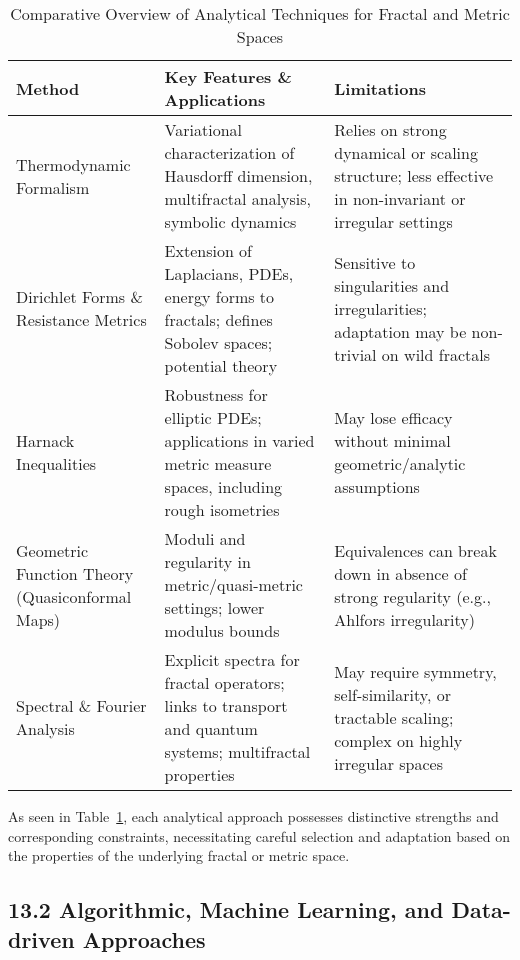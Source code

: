\documentclass[11pt]{article}
\begin{document}
\begin{table}[h]
\centering
\caption{Comparative Overview of Analytical Techniques for Fractal and Metric Spaces}
\label{tab:analytical_methods}
\begin{tabular}{|l|p{5.5cm}|p{4.5cm}|}
\hline
\textbf{Method} & \textbf{Key Features \& Applications} & \textbf{Limitations} \\
\hline
Thermodynamic Formalism & Variational characterization of Hausdorff dimension, multifractal analysis, symbolic dynamics & Relies on strong dynamical or scaling structure; less effective in non-invariant or irregular settings \\
\hline
Dirichlet Forms \& Resistance Metrics & Extension of Laplacians, PDEs, energy forms to fractals; defines Sobolev spaces; potential theory & Sensitive to singularities and irregularities; adaptation may be non-trivial on wild fractals \\
\hline
Harnack Inequalities & Robustness for elliptic PDEs; applications in varied metric measure spaces, including rough isometries & May lose efficacy without minimal geometric/analytic assumptions \\
\hline
Geometric Function Theory (Quasiconformal Maps) & Moduli and regularity in metric/quasi-metric settings; lower modulus bounds & Equivalences can break down in absence of strong regularity (e.g., Ahlfors irregularity) \\
\hline
Spectral \& Fourier Analysis & Explicit spectra for fractal operators; links to transport and quantum systems; multifractal properties & May require symmetry, self-similarity, or tractable scaling; complex on highly irregular spaces \\
\hline
\end{tabular}
\end{table}

As seen in Table~\ref{tab:analytical_methods}, each analytical approach possesses distinctive strengths and corresponding constraints, necessitating careful selection and adaptation based on the properties of the underlying fractal or metric space.

\subsection{13.2 Algorithmic, Machine Learning, and Data-driven Approaches}
\end{document}
